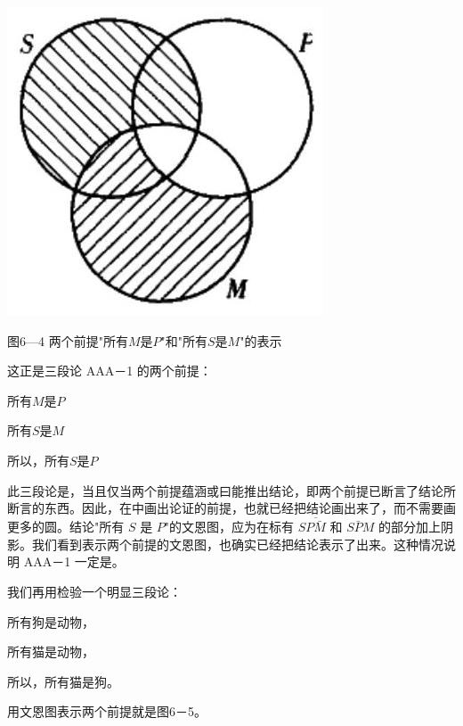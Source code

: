 \begin{center}
\includegraphics[width=\textwidth]{images/2025_05_15_6a28331d5e7c993ad07ag-275.jpg}

图6—4 两个前提"所有$M$是$P$"和"所有$S$是$M$"的表示
\end{center}

\begin{examplebox}[title=有效三段论的文恩图检验]
这正是三段论 AAA－1 的两个前提：

所有$M$是$P$

所有$S$是$M$

所以，所有$S$是$P$

此三段论是，当且仅当两个前提蕴涵或曰能推出结论，即两个前提已断言了结论所断言的东西。因此，在中画出论证的前提，也就已经把结论画出来了，而不需要画更多的圆。结论"所有 $S$ 是 $P$"的文恩图，应为在标有 $S\overline{P\bar{M}}$ 和 $S\bar{P}M$ 的部分加上阴影。我们看到表示两个前提的文恩图，也确实已经把结论表示了出来。这种情况说明 AAA－1 一定是。\cite{venn1881}
\end{examplebox}

\begin{examplebox}[title=无效三段论的文恩图检验]
我们再用检验一个明显三段论：

所有狗是动物，

所有猫是动物，

所以，所有猫是狗。

用文恩图表示两个前提就是图6－5。
\end{examplebox}

